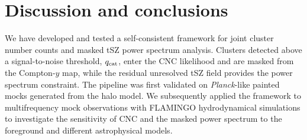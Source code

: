 \documentclass[aps,prd,twocolumn,superscriptaddress,nofootinbib,floatfix]{revtex4-2}
\begin{document}
\section{Discussion and conclusions}
\label{sec:discussion}
We have developed and tested a self-consistent framework for joint cluster
number counts and masked tSZ power spectrum analysis. Clusters detected above a signal-to-noise threshold, $q_{\rm cat}$, enter the CNC likelihood and are masked from the Compton-$y$ map, while the residual unresolved tSZ field provides the power spectrum constraint. The pipeline was first validated on \textit{Planck}-like painted mocks generated from the halo model. We subsequently applied the framework to multifrequency mock observations with FLAMINGO hydrodynamical simulations to investigate the sensitivity of CNC and the masked power spectrum to the foreground and different astrophysical models.
\end{document}
